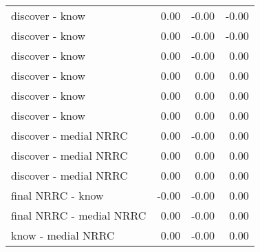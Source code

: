 \begin{longtable}{lrrr}
  discover - know & 0.00 & -0.00 & -0.00 \\ 
  discover - know & 0.00 & -0.00 & -0.00 \\ 
  discover - know & 0.00 & -0.00 & 0.00 \\ 
  discover - know & 0.00 & 0.00 & 0.00 \\ 
  discover - know & 0.00 & 0.00 & 0.00 \\ 
  discover - know & 0.00 & 0.00 & 0.00 \\ 
  discover - medial NRRC & 0.00 & -0.00 & 0.00 \\ 
  discover - medial NRRC & 0.00 & 0.00 & 0.00 \\ 
  discover - medial NRRC & 0.00 & 0.00 & 0.00 \\ 
  final NRRC - know & -0.00 & -0.00 & 0.00 \\ 
  final NRRC - medial NRRC & 0.00 & -0.00 & 0.00 \\ 
  know - medial NRRC & 0.00 & -0.00 & 0.00 \\ 
  \end{longtable}


